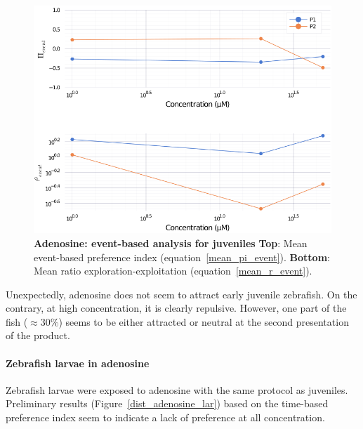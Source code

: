     \begin{figure}[h!]
      \centering
      \includegraphics[width=1\textwidth]{part_2/assets/adenosine_event.png}
      \caption{\textbf{Adenosine: event-based analysis for juveniles} \textbf{Top}: Mean event-based preference index (equation~\ref{mean_pi_event}). \textbf{Bottom}: Mean ratio exploration-exploitation (equation~\ref{mean_r_event}).}
      \label{adenosine_event}
    \end{figure}

  Unexpectedly, adenosine does not seem to attract early juvenile zebrafish. On the contrary, at high concentration, it is clearly repulsive. However, one part of the fish ($\approx 30 \%$) seems to be either attracted or neutral at the second presentation of the product.

  \paragraph{Zebrafish larvae in adenosine} Zebrafish larvae were exposed to adenosine with the same protocol as juveniles. Preliminary results (Figure~\ref{dist_adenosine_lar}) based on the time-based preference index seem to indicate a lack of preference at all concentration.

